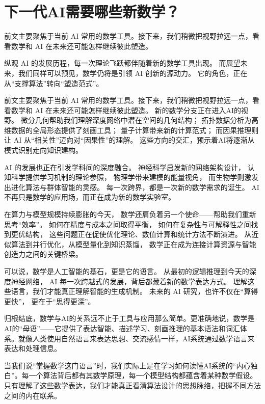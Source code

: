 \section{下一代AI需要哪些新数学？}
前文主要聚焦于当前 AI 常用的数学工具。接下来，我们稍微把视野拉远一点，看看数学和 AI 在未来还可能怎样继续彼此塑造。

纵观 AI 的发展历程，每一次理论飞跃都伴随着新的数学工具出现。  
而展望未来，我们同样可以预见，数学仍将是引领 AI 创新的源动力。  
它的角色，正在从“支撑算法”转向“塑造范式”。

前文主要聚焦于当前 AI 常用的数学工具。接下来，我们稍微把视野拉远一点，看看数学和 AI 在未来还可能怎样继续彼此塑造。
新的数学分支正在进入AI的视野。  
微分几何帮助我们理解深度网络中潜在空间的几何结构；  
拓扑数据分析为高维数据的全局形态提供了刻画工具；  
量子计算带来新的计算范式；  
而因果推理则让 AI 从“相关性”迈向对“因果性”的理解。  
这些方向的交汇，预示着AI将逐渐从模式识别走向知识建构。

AI 的发展也正在引发学科间的深度融合。  
神经科学启发新的网络架构设计，  
认知科学提供学习机制的理论参照，  
物理学带来建模的能量视角，  
而生物学则激发出进化算法与群体智能的灵感。  
每一次跨界，都是一次新的数学需求的诞生。  
AI 不再只是数学的应用场，而正在成为新的数学实验室。

在算力与模型规模持续膨胀的今天，  
数学还肩负着另一个使命——帮助我们重新思考“效率”。  
如何在精度与成本之间取得平衡，  
如何在复杂性与可解释性之间找到更优结构，  
这些问题正在促使优化理论、数值计算和统计方法不断演进。  
从近似算法到并行优化，从模型量化到知识蒸馏，  
数学正在成为连接计算资源与智能创造力之间的关键桥梁。

可以说，数学是人工智能的基石，更是它的语言。  
从最初的逻辑推理到今天的深度神经网络，  
AI 每一次跨越式的发展，背后都藏着新的数学表达方式。  
理解这些语言，我们才能真正理解智能的生成机制。  
未来的 AI 研究，也许不仅在“算得更快”，  
更在于“思得更深”。


归根结底，数学与AI的关系远不止于工具与应用那么简单。更准确地说，数学是AI的“母语”——它提供了表达智能、描述学习、刻画推理的基本语法和词汇体系。就像人类使用自然语言来表达思想、交流感情一样，AI系统通过数学语言来表达和处理信息。

当我们说“掌握数学这门语言”时，我们实际上是在学习如何读懂AI系统的“内心独白”。每一个算法背后都有其数学原理，每一个模型结构都蕴含着某种数学假设。只有理解了这些数学表达，我们才能真正看清算法设计的思想脉络，把握不同方法之间的内在联系。

